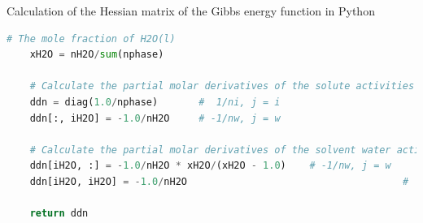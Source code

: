 \begin{frame}{Calculation of the Hessian matrix of the Gibbs energy function in Python}
\begin{lstlisting}[language=Python, caption=Calculating Jacobian using Python]
	# The mole fraction of H2O(l)
	xH2O = nH2O/sum(nphase)
	
	# Calculate the partial molar derivatives of the solute activities
	ddn = diag(1.0/nphase) 		 #  1/ni, j = i
	ddn[:, iH2O] = -1.0/nH2O	 # -1/nw, j = w
	
	# Calculate the partial molar derivatives of the solvent water activity
	ddn[iH2O, :] = -1.0/nH2O * xH2O/(xH2O - 1.0) 	# -1/nw, j = w
	ddn[iH2O, iH2O] = -1.0/nH2O								 		#  1/nw*xw/(xw -1), j<>w
	
	return ddn
\end{lstlisting}
\end{frame}
%
